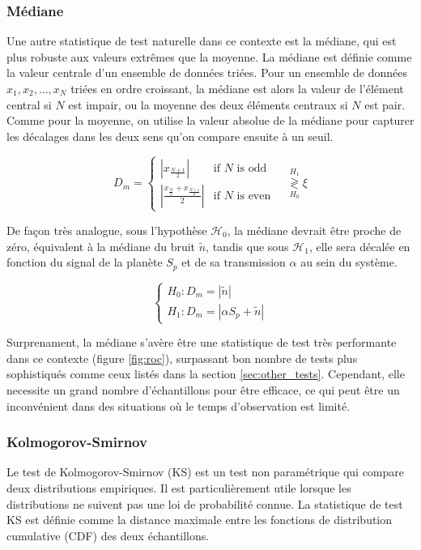 \documentclass{article}
\begin{document}
\subsubsection{Médiane}
Une autre statistique de test naturelle dans ce contexte est la médiane, qui est plus robuste aux valeurs extrêmes que la moyenne. La médiane est définie comme la valeur centrale d'un ensemble de données triées. Pour un ensemble de données $x_1, x_2, \ldots, x_N$ triées en ordre croissant, la médiane est alors la valeur de l'élément central si $N$ est impair, ou la moyenne des deux éléments centraux si $N$ est pair. Comme pour la moyenne, on utilise la valeur absolue de la médiane pour capturer les décalages dans les deux sens qu'on compare ensuite à un seuil.

$$
D_m = 
\begin{cases}
\left| x_{\frac{N+1}{2}} \right| & \text{if }N\text{ is odd} \\

\left| \frac{x_{\frac{N}{2}} + x_{\frac{N+1}{2}}}{2} \right|  & \text{if }N\text{ is even}
\end{cases}
\quad\stackrel{H_1}{\underset{H_0}{\gtrless}} \xi
$$

De façon très analogue, sous l'hypothèse $\mathcal{H}_0$, la médiane devrait être proche de zéro, équivalent à la médiane du bruit $\tilde{n}$, tandis que sous $\mathcal{H}_1$, elle sera décalée en fonction du signal de la planète $S_p$ et de sa transmission $\alpha$ au sein du système.

$$
\begin{cases}
H_0 : D_m = |\tilde{n}|\\
H_1 : D_m =  | \alpha S_p + \tilde{n} |
\end{cases}
$$

Surprenament, la médiane s'avère être une statistique de test très performante dans ce contexte (figure \ref{fig:roc}), surpassant bon nombre de tests plus sophistiqués comme ceux listés dans la section \ref{sec:other_tests}. Cependant, elle necessite un grand nombre d'échantillons pour être efficace, ce qui peut être un inconvénient dans des situations où le temps d'observation est limité.

\subsubsection{Kolmogorov-Smirnov}

Le test de Kolmogorov-Smirnov (KS) est un test non paramétrique qui compare deux distributions empiriques. Il est particulièrement utile lorsque les distributions ne suivent pas une loi de probabilité connue. La statistique de test KS est définie comme la distance maximale entre les fonctions de distribution cumulative (CDF) des deux échantillons.
\end{document}
